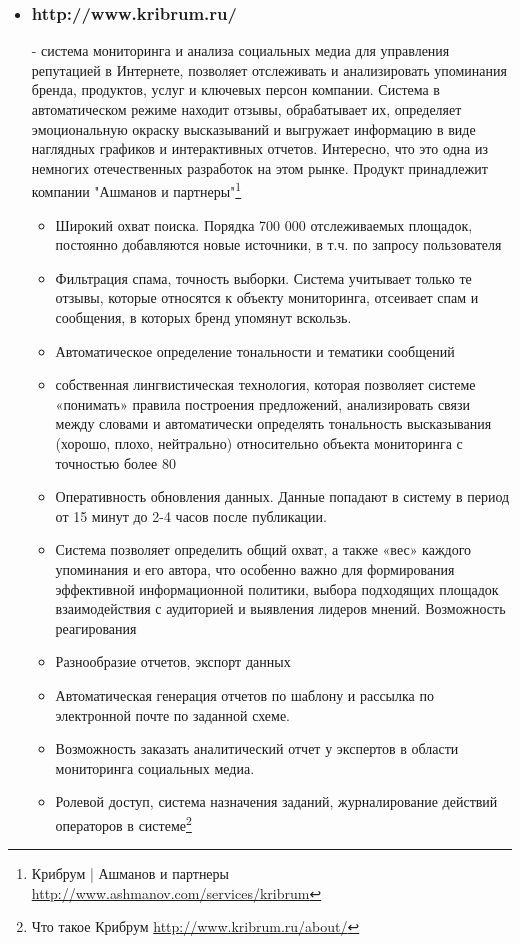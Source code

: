 \begin{chap1}
\begin{itemize}
\begin{itemize}
\end{itemize}
Подводя итог, можно сказать что topsy - является одним из лидеров на рынке извлечения данных из социальных сетей, но в силу того что рынок чрезвычайно разнообразен и имеет множество особенностей в разных странах мира, то topsy не является едиственным представителем этого класса сервисов
\item \subsubsection{http://www.kribrum.ru/} - система мониторинга и анализа социальных медиа для управления репутацией в Интернете, позволяет отслеживать и анализировать упоминания бренда, продуктов, услуг и ключевых персон компании. Система в автоматическом режиме находит отзывы, обрабатывает их, определяет эмоциональную окраску высказываний и выгружает информацию в виде наглядных графиков и интерактивных отчетов. Интересно, что это одна из немногих отечественных разработок на этом рынке. Продукт принадлежит компании "Ашманов и партнеры"\footnote{Крибрум | Ашманов и партнеры \url{http://www.ashmanov.com/services/kribrum} }
	\begin{itemize}
	\item Широкий охват поиска. Порядка 700 000 отслеживаемых площадок, постоянно добавляются новые источники, в т.ч. по запросу пользователя
	\item Фильтрация спама, точность выборки. Система учитывает только те отзывы, которые относятся к объекту мониторинга, отсеивает спам и сообщения, в которых бренд упомянут вскользь.
	\item Автоматическое определение тональности и тематики сообщений
	\item собственная лингвистическая технология, которая позволяет системе «понимать» правила построения предложений, анализировать связи между словами и автоматически определять тональность высказывания (хорошо, плохо, нейтрально) относительно объекта мониторинга с точностью более 80%
	\item Оперативность обновления данных. Данные попадают в систему в период от 15 минут до 2-4 часов после публикации.
	\item Система позволяет определить общий охват, а также «вес» каждого упоминания и его автора, что особенно важно для формирования эффективной информационной политики, выбора подходящих площадок взаимодействия с аудиторией и выявления лидеров мнений.
Возможность реагирования
	\item Разнообразие отчетов, экспорт данных
	\item Автоматическая генерация отчетов по шаблону и рассылка по электронной почте по заданной схеме.
	\item Возможность заказать аналитический отчет у экспертов в области мониторинга социальных медиа.
	\item Ролевой доступ, система назначения заданий, журналирование действий операторов в системе\footnote{Что такое Крибрум \url{http://www.kribrum.ru/about/}}
	\end{itemize}



\end{itemize}
\end{chap1}
